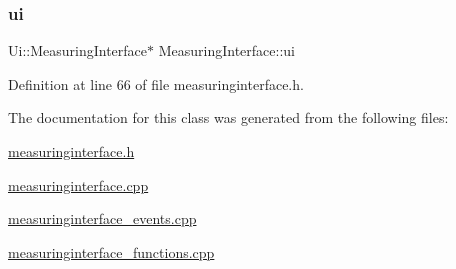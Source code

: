 \mbox{\label{class_measuring_interface_a6f8e1020a154cb26eb10d3755130e22f}} 
\subsubsection{\texorpdfstring{ui}{ui}}
{\footnotesize\ttfamily Ui\+::\+Measuring\+Interface$\ast$ Measuring\+Interface\+::ui\hspace{0.3cm}{\ttfamily [private]}}



Definition at line 66 of file measuringinterface.\+h.



The documentation for this class was generated from the following files\+:\begin{DoxyCompactItemize}
\item 
\mbox{\hyperlink{measuringinterface_8h}{measuringinterface.\+h}}\item 
\mbox{\hyperlink{measuringinterface_8cpp}{measuringinterface.\+cpp}}\item 
\mbox{\hyperlink{measuringinterface__events_8cpp}{measuringinterface\+\_\+events.\+cpp}}\item 
\mbox{\hyperlink{measuringinterface__functions_8cpp}{measuringinterface\+\_\+functions.\+cpp}}\end{DoxyCompactItemize}

